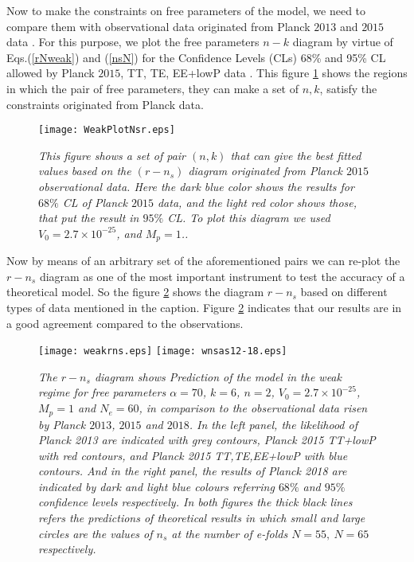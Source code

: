 \documentclass[12pt]{revtex4}
\begin{document}
Now to make the constraints on free parameters of the model, we need to compare them  with observational data originated from Planck $2013$ and $2015$ data \cite{Ade:2013ktc,Ade:2013uln,Planck2015}. For this purpose,  we plot the free parameters $n-k$ diagram by virtue of Eqs.(\ref{rNweak}) and (\ref{nsN})  for the Confidence Levels (CLs)  68\% and 95\% CL allowed by Planck $2015$, TT, TE, EE+lowP data \cite{Planck2015}. This figure \ref{fignrweak} shows the regions in which the {pair} of free parameters, they can make a set of ${n, k}$, satisfy the constraints originated from Planck data.
\begin{figure}[ht]
\centering
\texttt{[image: WeakPlotNsr.eps]}
\caption{{\it{This figure shows a set of {pair} $(n, k)$  that can give the best fitted values based on the  $(r-n_s)$ diagram originated from Planck $2015$ observational {data}. Here the dark blue color shows the results for $68\%$ CL of Planck $2015$ data, and the light red color shows those, that put the result in $95\%$ CL. To plot this diagram we used $V_0=2.7\times10^{-25}$, and $M_p=1$..}}}
\label{fignrweak}
\end{figure}












Now by means of an arbitrary set of the aforementioned pairs we can re-plot the  $r-n_s$ diagram as one of the most important {instrument} to test the accuracy of a theoretical model. So the figure \ref{fignsr} shows the diagram $r-n_s$ based on different types of data mentioned in the caption. Figure \ref{fignsr} indicates that our results are in a good agreement compared to the observations.
\begin{figure}[ht]
\centering
\texttt{[image: weakrns.eps]}
\texttt{[image: wnsas12-18.eps]}
\caption{{\it{
 The $r-n_s$ diagram shows  Prediction of
the model  in the weak regime for free parameters  $\alpha=70$, $k=6$,  $n=2$, $V_0=2.7\times10^{-25}$, $M_p=1$ and $N_e=60$,
in comparison to the observational data risen by Planck $2013$, $2015$ and $2018$. In the left panel, the likelihood  of  Planck 2013 are indicated with grey contours, Planck 2015 TT+lowP with red contours, and Planck 2015 TT,TE,EE+lowP with blue contours. And in the right panel, the results of Planck 2018 are indicated by dark and light blue colours referring $68\%$ and $95\%$ confidence levels respectively. In both figures the thick black lines
refers the predictions of theoretical results in which small and large circles are the values of $n_s$ at the number of e-folds $N=55,~N=65$ respectively.}}}
\label{fignsr}
\end{figure}
\end{document}
